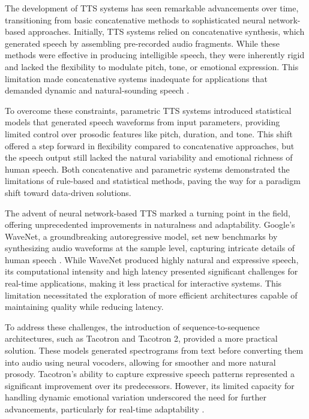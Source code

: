 The development of TTS systems has seen remarkable advancements over time, transitioning from basic concatenative methods to sophisticated neural network-based approaches. Initially, TTS systems relied on concatenative synthesis, which generated speech by assembling pre-recorded audio fragments. While these methods were effective in producing intelligible speech, they were inherently rigid and lacked the flexibility to modulate pitch, tone, or emotional expression. This limitation made concatenative systems inadequate for applications that demanded dynamic and natural-sounding speech \cite{taylor2009text}.

To overcome these constraints, parametric TTS systems introduced statistical models that generated speech waveforms from input parameters, providing limited control over prosodic features like pitch, duration, and tone. This shift offered a step forward in flexibility compared to concatenative approaches, but the speech output still lacked the natural variability and emotional richness of human speech. Both concatenative and parametric systems demonstrated the limitations of rule-based and statistical methods, paving the way for a paradigm shift toward data-driven solutions.

The advent of neural network-based TTS marked a turning point in the field, offering unprecedented improvements in naturalness and adaptability. Google’s WaveNet, a groundbreaking autoregressive model, set new benchmarks by synthesizing audio waveforms at the sample level, capturing intricate details of human speech \cite{van2016wavenet}. While WaveNet produced highly natural and expressive speech, its computational intensity and high latency presented significant challenges for real-time applications, making it less practical for interactive systems. This limitation necessitated the exploration of more efficient architectures capable of maintaining quality while reducing latency.

To address these challenges, the introduction of sequence-to-sequence architectures, such as Tacotron and Tacotron 2, provided a more practical solution. These models generated spectrograms from text before converting them into audio using neural vocoders, allowing for smoother and more natural prosody. Tacotron’s ability to capture expressive speech patterns represented a significant improvement over its predecessors. However, its limited capacity for handling dynamic emotional variation underscored the need for further advancements, particularly for real-time adaptability \cite{wang2017tacotron}.

